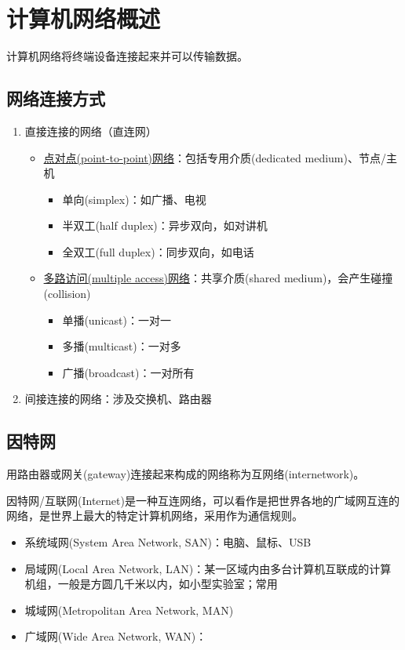 
\section{计算机网络概述}
计算机网络将终端设备连接起来并可以传输数据。

\subsection{网络连接方式}
\begin{enumerate}
\item 直接连接的网络（直连网）
\begin{itemize}
\item \underline{点对点(point-to-point)网络}：包括专用介质(dedicated medium)、节点/主机
\begin{itemize}
	\item 单向(simplex)：如广播、电视
	\item 半双工(half duplex)：异步双向，如对讲机
	\item 全双工(full duplex)：同步双向，如电话
\end{itemize}
\item \underline{多路访问(multiple access)网络}：共享介质(shared medium)，会产生碰撞(collision)
\begin{itemize}
	\item 单播(unicast)：一对一
	\item 多播(multicast)：一对多
	\item 广播(broadcast)：一对所有
\end{itemize}
\end{itemize}
\item 间接连接的网络：涉及交换机、路由器
\end{enumerate}

\subsection{因特网}
用路由器或网关(gateway)连接起来构成的网络称为互网络(internetwork)。

因特网/互联网(Internet)是一种互连网络，可以看作是把世界各地的广域网互连的网络，是世界上最大的特定计算机网络，采用作为通信规则。
\begin{itemize}
	\item 系统域网(System Area Network, SAN)：电脑、鼠标、USB
	\item 局域网(Local Area Network, LAN)：某一区域内由多台计算机互联成的计算机组，一般是方圆几千米以内，如小型实验室；常用
	\item 城域网(Metropolitan Area Network, MAN)
	\item 广域网(Wide Area Network, WAN)：
\end{itemize}

